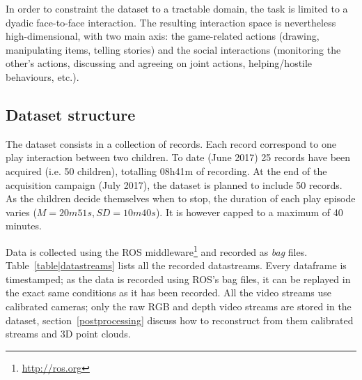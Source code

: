 \documentclass{article}
\newcommand{\ie}{i.e.\xspace}
\begin{document}
In order to constraint the dataset to a tractable domain, the task is limited to
a dyadic face-to-face interaction.  The resulting interaction space is
nevertheless high-dimensional, with two main axis: the game-related actions
(drawing, manipulating items, telling stories) and the social interactions
(monitoring the other's actions, discussing and agreeing on joint actions,
helping/hostile behaviours, etc.).

%
%
%
%
%



\subsection{Dataset structure}

The dataset consists in a collection of records. Each record correspond to one
play interaction between two children. To date (June 2017) 25 records have been
acquired (\ie 50 children), totalling 08h41m of recording. At the end of the acquisition campaign
(July 2017), the dataset is planned to include 50 records. As
the children decide themselves when to stop, the duration of each play episode varies ($M=20m51s,
SD=10m40s$). It is however capped to a maximum of 40 minutes.

Data is collected using the ROS middleware\footnote{\url{http://ros.org}} and
recorded as \emph{bag} files. Table~\ref{table|datastreams} lists all the
recorded datastreams.  Every dataframe is timestamped; as the data is recorded
using ROS's bag files, it can be replayed in the exact same conditions as it
has been recorded.  All the video streams use calibrated cameras; only the raw
RGB and depth video streams are stored in the dataset, section~\ref{postprocessing} discuss
how to reconstruct from them calibrated streams and 3D point clouds.
\end{document}
